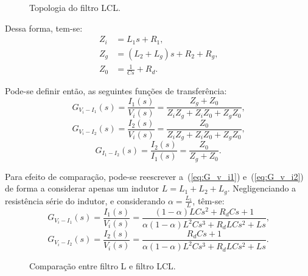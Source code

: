   \begin{figure}[htb]
    \centering{
      \def\svgwidth{\textwidth}
      }
    \renewcommand\figurename{Fig.}
    \caption{Topologia do filtro LCL.}
    \label{fig:LCL_topologia}
  \end{figure}

  Dessa forma, tem-se:
  \begin{equation}
  	\begin{split}
      Z_i & = L_1s +R_1 \text{,} \\
      Z_g & = (L_2 + L_g)s + R_2 + R_g \text{,} \\
      Z_0 & = \frac{1}{Cs} + R_d \text{.}
    \end{split}
  \end{equation}

  Pode-se definir então, as seguintes funções de transferência:
  \begin{equation}
    G_{V_i-I_1}(s) = \frac{I_1(s)}{V_i(s)} = \frac{Z_g + Z_0}{Z_iZ_g
    	+ Z_iZ_0 + Z_gZ_0} \text{,}
    \label{eq:G_v_i1}
  \end{equation}
  \begin{equation}
    G_{V_i-I_2}(s) = \frac{I_2(s)}{V_i(s)} = \frac{Z_0}{Z_iZ_g
    	+ Z_iZ_0 + Z_gZ_0} \text{,}
    \label{eq:G_v_i2}
  \end{equation}
  \begin{equation}
    G_{I_1-I_2}(s) = \frac{I_2(s)}{I_1(s)} = \frac{Z_0}{Z_g + Z_0}
    	 \text{.}
    \label{eq:G_i1_i2}
  \end{equation}

  Para efeito de comparação, pode-se reescrever a~(\ref{eq:G_v_i1}) e~(\ref{eq:G_v_i2}) de forma a considerar apenas um indutor $L = L_1 + L_2 + L_g$. Negligenciando a resistência série do indutor, e considerando $\alpha = \frac{L_1}{L}$, têm-se:
  \begin{equation}
    G_{V_i-I_1}(s) = \frac{I_1(s)}{V_i(s)} =
    	\frac{(1-\alpha)LCs^2+R_dCs+1}{\alpha(1-\alpha)L^2Cs^3+R_dLCs^2+Ls} \text{,}
  \end{equation}
  \begin{equation}
    G_{V_i-I_2}(s) = \frac{I_2(s)}{V_i(s)} =
    	\frac{R_dCs+1}{\alpha(1-\alpha)L^2Cs^3+R_dLCs^2+Ls}  \text{.}
    \label{eq:G_v_i2_2}
  \end{equation}

  \begin{figure}[htb]
    \centering{
      \def\svgwidth{\textwidth}
      }
    \caption{Comparação entre filtro L e filtro LCL.}
    \label{fig:L_vs_LCL}
  \end{figure}

